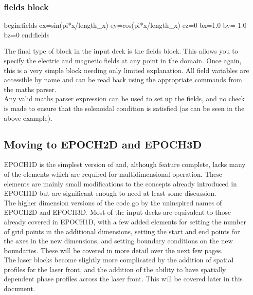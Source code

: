 \documentclass[12pt,a4paper]{article}
\newcommand{\inlineemph}[1]{{\color{warwicklight} \bf{#1}}}
\newcommand{\EPOCH}{{\color{warwickdark}\fontfamily{phv}\selectfont{EPOCH}}}
\newenvironment{lboxverbatim}[1]{
\setlength{\FrameSep}{0pt}
\def\FrameCommand{\fboxsep=0pt \colorbox{shadecolor}}
\MakeFramed{\FrameRestore}
\vspace{-13.5pt}
\fvset{label=#1}
\boxverb
}{
\endboxverb
\vspace{-13.5pt}
\endMakeFramed
}
\begin{document}
\subsubsection{\inlineemph{fields} block}
\begin{lboxverbatim}{fields block}
begin:fields
   ex=sin(pi*x/length_x)
   ey=cos(pi*x/length_x)
   ez=0
   bx=1.0
   by=-1.0
   bz=0
end:fields
\end{lboxverbatim}

The final type of block in the {\EPOCH} input deck is the fields block. This
allows you to specify the electric and magnetic fields at any point in the
domain. Once again, this is a very simple block needing only limited
explanation. All field variables are accessible by name and can be read back
using the appropriate commands from the maths parser. \\

Any valid maths parser expression can be used to set up the fields, and no
check is made to ensure that the solenoidal condition is satisfied (as can be
seen in the above example).\\

\subsection{Moving to EPOCH2D and EPOCH3D}
EPOCH1D is the simplest version of {\EPOCH} and, although feature complete,
lacks many of the elements which are required for multidimensional operation.
These elements are mainly small modifications to the concepts already
introduced in EPOCH1D but are significant enough to need at least some
discussion.\\

The higher dimension versions of the code go by the uninspired names of EPOCH2D
and EPOCH3D. Most of the input decks are equivalent to those already covered in
EPOCH1D, with a few added elements for setting the number of grid points in the
additional dimensions, setting the start and end points for the axes in the new
dimensions, and setting boundary conditions on the new boundaries. These will
be covered in more detail over the next few pages.\\

The laser blocks become slightly more complicated by the addition of spatial
profiles for the laser front, and the addition of the ability to have spatially
dependent phase profiles across the laser front. This will be covered later in
this document.\\
\end{document}
